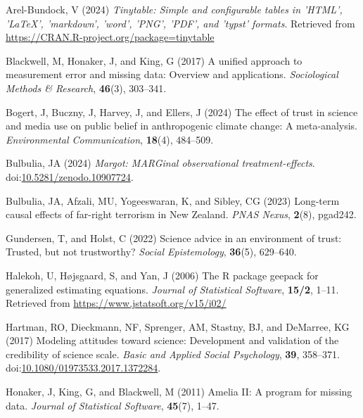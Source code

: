 \documentclass[
  single column]{article}
\newlength{\cslhangindent}
\newenvironment{CSLReferences}[2] %
 {\begin{list}{}{%
  \setlength{\itemindent}{0pt}
  \setlength{\leftmargin}{0pt}
  \setlength{\parsep}{0pt}
  \ifodd #1
   \setlength{\leftmargin}{\cslhangindent}
   \setlength{\itemindent}{-1\cslhangindent}
  \fi
  \setlength{\itemsep}{#2\baselineskip}}}
 {\end{list}}
\begin{document}
\label{refs}
\begin{CSLReferences}{1}{0}
Arel-Bundock, V (2024) \emph{Tinytable: Simple and configurable tables
in 'HTML', 'LaTeX', 'markdown', 'word', 'PNG', 'PDF', and 'typst'
formats}. Retrieved from
\url{https://CRAN.R-project.org/package=tinytable}

Blackwell, M, Honaker, J, and King, G (2017) A unified approach to
measurement error and missing data: Overview and applications.
\emph{Sociological Methods \& Research}, \textbf{46}(3), 303--341.

Bogert, J, Buczny, J, Harvey, J, and Ellers, J (2024) The effect of
trust in science and media use on public belief in anthropogenic climate
change: A meta-analysis. \emph{Environmental Communication},
\textbf{18}(4), 484--509.

Bulbulia, JA (2024) \emph{Margot: MARGinal observational
treatment-effects}.
doi:\href{https://doi.org/10.5281/zenodo.10907724}{10.5281/zenodo.10907724}.

Bulbulia, JA, Afzali, MU, Yogeeswaran, K, and Sibley, CG (2023)
Long-term causal effects of far-right terrorism in {N}ew {Z}ealand.
\emph{PNAS Nexus}, \textbf{2}(8), pgad242.

Gundersen, T, and Holst, C (2022) Science advice in an environment of
trust: Trusted, but not trustworthy? \emph{Social Epistemology},
\textbf{36}(5), 629--640.

Halekoh, U, Højsgaard, S, and Yan, J (2006) The {R} package geepack for
generalized estimating equations. \emph{Journal of Statistical
Software}, \textbf{15/2}, 1--11. Retrieved from
\url{https://www.jstatsoft.org/v15/i02/}

Hartman, RO, Dieckmann, NF, Sprenger, AM, Stastny, BJ, and DeMarree, KG
(2017) Modeling attitudes toward science: Development and validation of
the credibility of science scale. \emph{Basic and Applied Social
Psychology}, \textbf{39}, 358--371.
doi:\href{https://doi.org/10.1080/01973533.2017.1372284}{10.1080/01973533.2017.1372284}.

Honaker, J, King, G, and Blackwell, M (2011) {Amelia II}: A program for
missing data. \emph{Journal of Statistical Software}, \textbf{45}(7),
1--47.


\end{CSLReferences}
\end{document}
